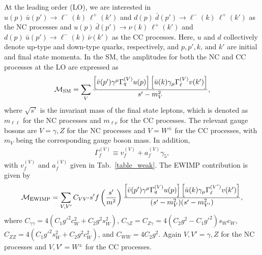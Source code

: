 \documentclass[12pt, a4paper]{article}
\begin{document}
At the leading order (LO), we are interested in $u(p)~\bar{u}(p') \to
\ell^{-}(k)~\ell^{+}(k')$ and $d(p)~\bar{d}(p') \to
\ell^{-}(k)~\ell^{+}(k')$ as the NC processes and $u(p)~\bar{d}(p')
\to \nu(k)~\ell^{+}(k')$ and $d(p)~\bar{u}(p') \to
\ell^{-}(k)~\bar{\nu}(k')$ as the CC processes.  Here, $u$ and $d$
collectively denote up-type and down-type quarks, respectively, and
$p, p', k$, and $k'$ are initial and final state momenta.  In the SM,
the amplitudes for both the NC and CC processes at the LO are
expressed as
\begin{align}
 \mathcal{M}_{\rm SM} = \sum_{V} \frac{\left[ \bar{v}(p')
 \gamma^\mu \Gamma_q^{(V)} u(p) \right] \left[ \bar{u}(k) \gamma_\mu
 \Gamma_{\ell}^{(V)} v(k') \right]}{s' - m_V^2},\label{eq_m_sm}
\end{align}
where $\sqrt{s'}$ is the invariant mass of the final state leptons,
which is denoted as $m_{\ell\ell}$ for the NC processes and
$m_{\ell\nu}$ for the CC processes.  The relevant gauge bosons are $V
= \gamma, Z$ for the NC processes and $V = W^\pm$ for the CC
processes, with $m_V$ being the corresponding gauge boson mass. In addition,
\begin{align}
  \Gamma_f^{(V)} \equiv v_f^{(V)} + a_f^{(V)} \gamma_5,
\end{align}
with $v_f^{(V)}$ and $a_f^{(V)}$ given in Tab.~\ref{table_weak}.
The EWIMP contribution is given by
\begin{align}
 \mathcal{M}_{\rm EWIMP} = \sum_{V,V'} C_{VV'} s' f\left(\frac{s'}{m^2}\right)
 \frac{\left[ \bar{v}(p') \gamma^\mu \Gamma_q^{(V)} u(p) \right]
 \left[ \bar{u}(k) \gamma_\mu \Gamma_\ell^{(V')} v(k') \right]}
 {(s'-m_V^2)(s'-m_{V'}^2)},\label{eq_m_ewimp}
\end{align}
where $C_{\gamma \gamma} = 4(C_1 g'^2 c_W^2 + C_2 g^2 s_W^2)$,
$C_{\gamma Z} = C_{Z \gamma} = 4(C_2 g^2 - C_1 g'^2) s_W c_W$, $C_{Z
  Z} = 4(C_1 g'^2 s_W^2 + C_2 g^2 c_W^2)$, and $C_{WW} = 4 C_2 g^2$.
Again $V, V' = \gamma, Z$ for the NC processes and $V, V' = W^\pm$ for
the CC processes.
\end{document}
